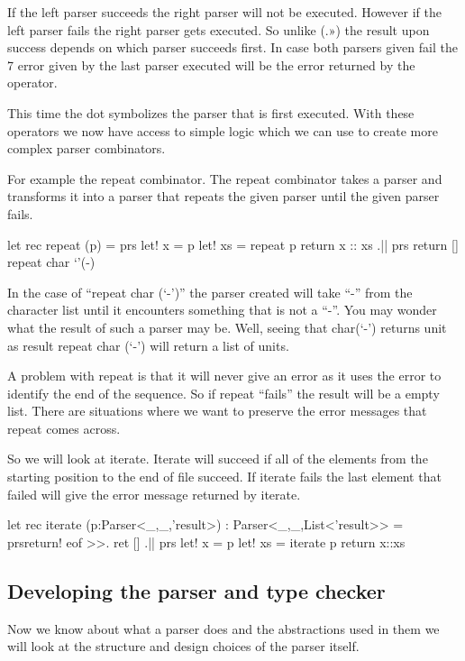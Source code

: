 If the left parser succeeds the right parser will not be executed. However if the left parser fails the right parser gets executed. So unlike (.») the result upon success depends on which parser succeeds first. In case both parsers given fail the 7 error given by the last parser executed will be the error returned by the operator. 

This time the dot symbolizes the parser that is first executed. With these operators we now have access to simple logic which we can use to create more complex parser combinators. 

For example the repeat combinator. The repeat combinator takes a parser and transforms it into a parser that repeats the given parser until the given parser fails.

\begin{code}
	let rec repeat (p) = 
		prs{ 
			let! x = p 
			let! xs = repeat p 
			return x :: xs 
		} .|| prs {return []} 
	repeat char ‘’(-) 
\end{code}

In the case of “repeat char (‘-’)” the parser created will take “-” from the character list until it encounters something that is not a “-”. You may wonder what the result of such a parser may be. Well, seeing that char(‘-’) returns unit as result repeat char (‘-’) will return a list of units. 

A problem with repeat is that it will never give an error as it uses the error to identify the end of the sequence. So if repeat “fails” the result will be a empty list. There are situations where we want to preserve the error messages that repeat comes across. 

So we will look at iterate. Iterate will succeed if all of the elements from the starting position to the end of file succeed. If iterate fails the last element that failed will give the error message returned by iterate. 

\begin{code}
	let rec iterate (p:Parser<_,_,'result>) : Parser<_,_,List<'result>> = 
	prs{return! eof >>. ret []} .|| 
	prs{ 
		let! x = p 
		let! xs = iterate p 
		return x::xs 
	}
\end{code}

\subsection{Developing the parser and type checker}
Now we know about what a parser does and the abstractions used in them we will look at the structure and design choices of the parser itself.

